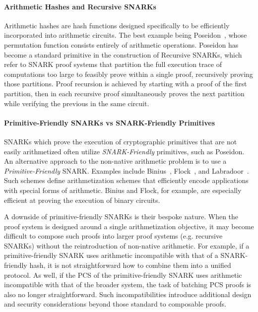 \paragraph{Arithmetic Hashes and Recursive SNARKs}

Arithmetic hashes are hash functions designed specifically to be efficiently incorporated
into arithmetic circuits. The best example being Poseidon~\cite{cryptoeprint:2019/458}, whose 
permutation function consists entirely of arithmetic operations. Poseidon has become a standard 
primitive in the construction of Recursive SNARKs, which refer to SNARK proof systems that partition 
the full execution trace of computations too large to feasibly prove within a single proof,
recursively proving those partitions. Proof recursion is achieved by starting with a proof 
of the first partition, then in each recursive proof simultaneously proves the next partition 
while verifying the previous in the same circuit.

\paragraph{Primitive-Friendly SNARKs vs SNARK-Friendly Primitives}\label{friendliness} 

SNARKs which prove the execution of cryptographic primitives that are not easily arithmetized 
often utilize \emph{SNARK-Friendly} primitives, such as Poseidon. An alternative approach to the 
non-native arithmetic problem is to use a \emph{Primitive-Friendly} SNARK. Examples include
Binius~\cite{cryptoeprint:2023/1784},
Flock~\cite{cryptoeprint:2026/1329}, and Labradoor~\cite{cryptoeprint:2022/1341}.
Such schemes define arithmetization schemes that efficiently encode applications with
special forms of arithmetic. Binius and Flock, for example, are especially efficient 
at proving the execution of 
binary circuits. 

A downside of primitive-friendly SNARKs is their bespoke nature. When the proof system is designed 
around a single arithmetization objective, it may become difficult to compose such proofs into larger 
proof systems (e.g. recursive SNARKs) without the reintroduction of non-native arithmetic. For example, 
if a primitive-friendly SNARK uses arithmetic incompatible with that of a SNARK-friendly hash,  
it is not straightforward how to combine them into a unified protocol. As well, if the PCS of the 
primitive-friendly SNARK uses arithmetic incompatible with that of the broader system, the task of 
batching PCS proofs is also no longer straightforward. Such incompatibilities introduce additional 
design and security considerations beyond those standard to composable proofs.

